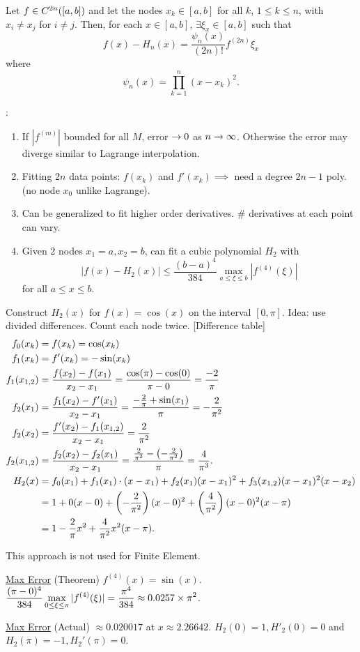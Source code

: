 \documentclass[]{article}
\begin{document}
\begin{theorem}
	[Error] Let $f\in C^{2n}({[}a,b{]})$ and let the nodes $x_k\in[a,b]$ for all $k$, $1\leq k\leq n$, with $x_i\neq x_j$ for $i\neq j$.
	Then, for each $x\in[a,b]$, $\exists\xi_x\in[a,b]$ such that $$f(x) - H_n(x) = \frac{\psi_n(x)}{(2n)!}f^{(2n)}{\xi_x}$$ where $$\psi_n(x) = \prod_{k=1}^n (x-x_k)^2.$$
\end{theorem}
\begin{note}:
	\begin{enumerate}
		\item If $|f^{(m)}|$ bounded for all $M$, error $\rightarrow0$ as $n\rightarrow\infty$. Otherwise the error may diverge similar to Lagrange interpolation.
		\item Fitting $2n$ data points: $f(x_k)$ and $f'(x_k) \implies$ need a degree $2n-1$ poly. (no node $x_0$ unlike Lagrange).
		\item Can be generalized to fit higher order derivatives. \# derivatives at each point can vary.
		\item Given 2 nodes $x_1=a,x_2=b$, can fit a cubic polynomial $H_2$ with
			$$ |f(x)-H_2(x)| \leq \frac{(b-a)^4}{384} \max_{a\leq\xi\leq b} |f^{(4)}(\xi)|$$ for all $a\leq x\leq b$.
	\end{enumerate}
\end{note}
\begin{example}
	Construct $H_2(x)$ for $f(x) = \cos(x)$ on the interval $[0,\pi]$.
	Idea: use divided differences. Count each node twice.	
	[Difference table]
	\begin{align*}
		f_0(x_k) &= f(x_k) = \cos(x_k) \\
		f_1(x_k) &= f'(x_k) = -\sin(x_k) \\
		f_1(x_{1,2}) &= \frac{f(x_2)-f(x_1)}{x_2-x_1} = \frac{\cos(\pi)-\cos(0)}{\pi-0} = \frac{-2}\pi \\
		f_2(x_1) &= \frac{f_1(x_2)-f'(x_1)}{x_2-x_1} = \frac{-\frac2\pi+\sin(x_1)}\pi = -\frac2{\pi^2} \\
		f_2(x_2) &= \frac{f'(x_2)-f_1(x_{1,2})}{x_2-x_1} = \frac2{\pi^2} \\
		f_2(x_{1,2}) &= \frac{f_2(x_2)-f_2(x_1)}{x_2-x_1} = \frac{\frac2{\pi^2}-\left(-\frac2{\pi^2}\right)}\pi = \frac4{\pi^3}. \\
		H_2(x) &= f_0(x_1) + f_1(x_1)\cdot(x-x_1) + f_2(x_1)(x-x_1)^2 + f_3(x_{1,2})(x-x_1)^2(x-x_2) \\
		&= 1 + 0(x-0) + \left(-\frac2{\pi^2}\right)(x-0)^2 + \left(\frac4{\pi^2}\right)(x-0)^2(x-\pi) \\
		&= 1-\frac2\pi x^2 + \frac4{\pi^2}x^2(x-\pi).
	\end{align*}
	\begin{remark}
		This approach is not used for Finite Element.
	\end{remark}
	\ul{Max Error} (Theorem) $f^{(4)}(x) = \sin(x)$.
	$\displaystyle \frac{(\pi-0)^4}{384} \max_{0\leq\xi\leq\pi} |f^{(4)}(\xi)| = \frac{\pi^4}{384} \approx 0.0257\times\pi^2$.

	\ul{Max Error} (Actual) $\approx 0.020017$ at $x\approx 2.26642$.
	$H_2(0) = 1,H'_2(0) = 0$ and $H_2(\pi)=-1,H_2'(\pi)=0$.
\end{example}
\end{document}
